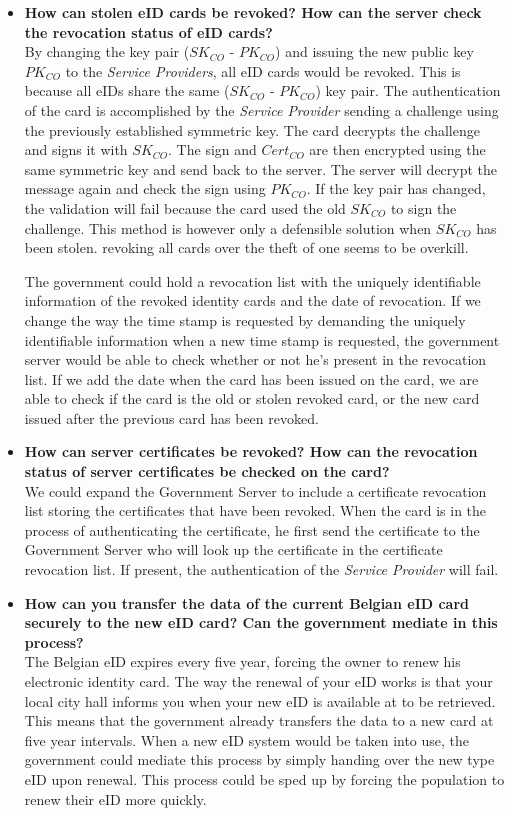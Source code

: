 \documentclass[12pt]{report}
\begin{document}
\begin{itemize}
\item \textbf{How can stolen eID cards be revoked? How can the server check the revocation status of eID cards?}\\
By changing the key pair ($SK_{CO}$ - $PK_{CO}$) and issuing the new public key $PK_{CO}$ to the \textit{Service Providers}, all eID cards would be revoked. This is because all eIDs share the same ($SK_{CO}$ - $PK_{CO}$) key pair. The authentication of the card is accomplished by the \textit{Service Provider} sending a challenge using the previously established symmetric key. The card decrypts the challenge and signs it with $SK_{CO}$. The sign and $Cert_{CO}$ are then encrypted using the same symmetric key and send back to the server. The server will decrypt the message again and check the sign using $PK_{CO}$. If the key pair has changed, the validation will fail because the card used the old $SK_{CO}$ to sign the challenge. This method is however only a defensible solution when $SK_{CO}$ has been stolen. revoking all cards over the theft of one seems to be overkill.

The government could hold a revocation list with the uniquely identifiable information of the revoked identity cards and the date of revocation. If we change the way the time stamp is requested by demanding the uniquely identifiable information when a new time stamp is requested, the government server would be able to check whether or not he's present in the revocation list. If we add the date when the card has been issued on the card, we are able to check if the card is the old or stolen revoked card, or the new card issued after the previous card has been revoked.

\item \textbf{How can server certificates be revoked? How can the revocation status of server certificates be checked on the card?}\\
We could expand the Government Server to include a certificate revocation list storing the certificates that have been revoked. When the card is in the process of authenticating the certificate, he first send the certificate to the Government Server who will look up the certificate in the certificate revocation list. If present, the authentication of the \textit{Service Provider} will fail.

\item \textbf{How can you transfer the data of the current Belgian eID card securely to the new eID card? Can the government mediate in this process?}\\
The Belgian eID expires every five year, forcing the owner to renew his electronic identity card. The way the renewal of your eID works is that your local city hall informs you when your new eID is available at to be retrieved. This means that the government already transfers the data to a new card at five year intervals. When a new eID system would be taken into use, the government could mediate this process by simply handing over the new type eID upon renewal. This process could be sped up by forcing the population to renew their eID more quickly.


\end{itemize}
\end{document}
